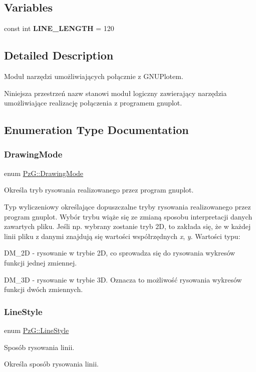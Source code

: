 \subsection*{Variables}
\begin{DoxyCompactItemize}
\item 
\mbox{\label{namespace_pz_g_a6d8d7783183a08d769e3c695cd35587f}} 
const int {\bfseries L\+I\+N\+E\+\_\+\+L\+E\+N\+G\+TH} = 120
\end{DoxyCompactItemize}


\subsection{Detailed Description}
Moduł narzędzi umożliwiających połącznie z G\+N\+U\+Plotem. 

Niniejsza przestrzeń nazw stanowi moduł logiczny zawierający narzędzia umożliwiające realizację połączenia z programem {\ttfamily gnuplot}. 

\subsection{Enumeration Type Documentation}
\mbox{\label{namespace_pz_g_a4360c76a1dbf714a19a0d97fe56e0660}} 
\subsubsection{\texorpdfstring{Drawing\+Mode}{DrawingMode}}
{\footnotesize\ttfamily enum \hyperlink{namespace_pz_g_a4360c76a1dbf714a19a0d97fe56e0660}{Pz\+G\+::\+Drawing\+Mode}}



Określa tryb rysowania realizowanego przez program {\ttfamily gnuplot}. 

Typ wyliczeniowy określające dopuszczalne tryby rysowania realizowanego przez program {\ttfamily gnuplot}. Wybór trybu wiąże się ze zmianą sposobu interpretacji danych zawartych pliku. Jeśli np. wybrany zostanie tryb 2D, to zakłada się, że w każdej linii pliku z danymi znajdują się wartości współrzędnych {\itshape x}, {\itshape y}. Wartości typu\+: \begin{DoxyItemize}
\item {\ttfamily D\+M\+\_\+2D} -\/ rysowanie w trybie 2D, co sprowadza się do rysowania wykresów funkcji jednej zmiennej. \item {\ttfamily D\+M\+\_\+3D} -\/ rysowanie w trybie 3D. Oznacza to możliwość rysowania wykresów funkcji dwóch zmiennych. \end{DoxyItemize}
\mbox{\label{namespace_pz_g_ab0580cdb6bfe9e51d7de2588bc824076}} 
\subsubsection{\texorpdfstring{Line\+Style}{LineStyle}}
{\footnotesize\ttfamily enum \hyperlink{namespace_pz_g_ab0580cdb6bfe9e51d7de2588bc824076}{Pz\+G\+::\+Line\+Style}}



Sposób rysowania linii. 

Określa sposób rysowania linii. 